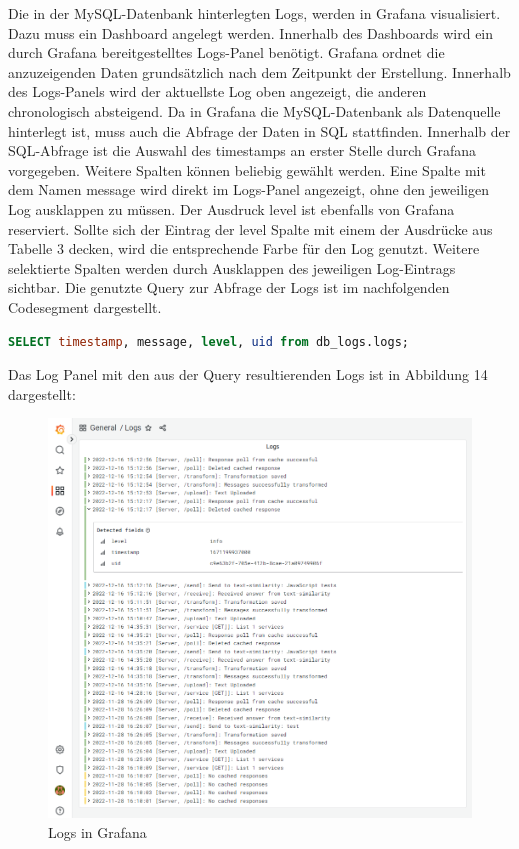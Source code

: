 Die in der MySQL-Datenbank hinterlegten Logs, werden in Grafana visualisiert. Dazu muss ein Dashboard angelegt werden. Innerhalb des Dashboards wird ein durch Grafana bereitgestelltes Logs-Panel benötigt. Grafana ordnet die anzuzeigenden Daten grundsätzlich nach dem Zeitpunkt der Erstellung. Innerhalb des Logs-Panels wird der aktuellste Log oben angezeigt, die anderen chronologisch absteigend. Da in Grafana die MySQL-Datenbank als Datenquelle hinterlegt ist, muss auch die Abfrage der Daten in SQL stattfinden. Innerhalb der SQL-Abfrage ist die Auswahl des timestamps an erster Stelle durch Grafana vorgegeben. Weitere Spalten können beliebig gewählt werden. Eine Spalte mit dem Namen \glqq message\grqq{} wird direkt im Logs-Panel angezeigt, ohne den jeweiligen Log ausklappen zu müssen. Der Ausdruck \glqq level\grqq{} ist ebenfalls von Grafana reserviert. Sollte sich der Eintrag der \glqq level\grqq{} Spalte mit einem der Ausdrücke aus Tabelle 3 decken, wird die entsprechende Farbe für den Log genutzt. Weitere selektierte Spalten werden durch Ausklappen des jeweiligen Log-Eintrags sichtbar. Die genutzte Query zur Abfrage der Logs ist im nachfolgenden Codesegment dargestellt.

\begin{lstlisting}[language=SQL, caption={Query zur Abfrage der Logs in Grafana}]
SELECT timestamp, message, level, uid from db_logs.logs;
\end{lstlisting}

Das Log Panel mit den aus der Query resultierenden Logs ist in Abbildung 14 dargestellt:

\begin{figure}[H]
  \centering
    \includegraphics[width = 15cm]{bilder/grafana}
    \caption{Logs in Grafana}
\end{figure}

